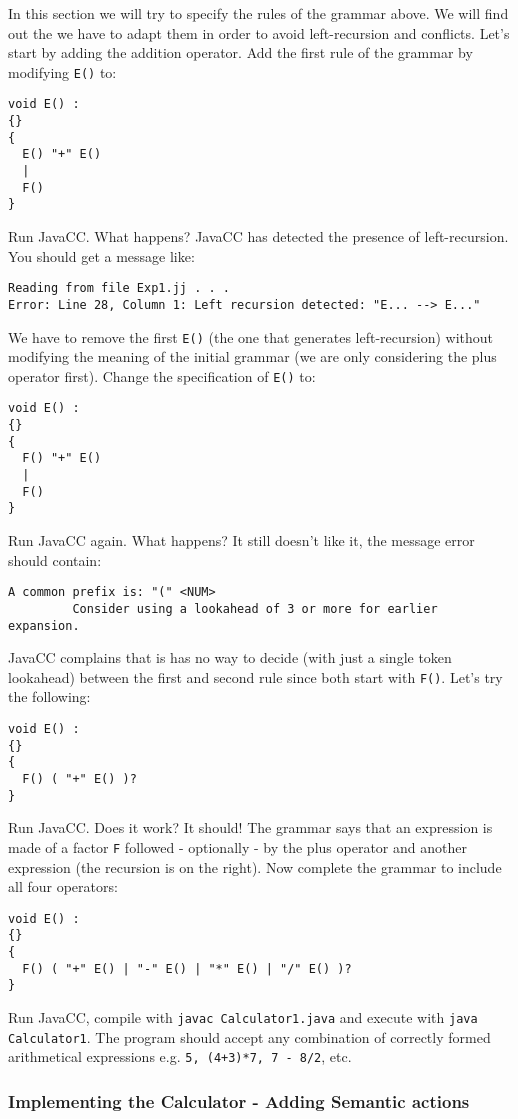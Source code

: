 \documentclass{article}
\begin{document}
In this section we will try to specify the rules of the grammar above. We will find out the we have to adapt them in  order to avoid left-recursion and conflicts. Let's start by adding the addition operator. Add the first rule of the grammar by modifying {\tt E()} to:
\begin{verbatim}
void E() :
{}
{
  E() "+" E()
  |
  F() 
}
\end{verbatim} 
Run JavaCC. What happens? JavaCC has detected the presence of left-recursion. You should get a message like:
\begin{verbatim}
Reading from file Exp1.jj . . .
Error: Line 28, Column 1: Left recursion detected: "E... --> E..."
\end{verbatim}
We have to remove the first {\tt E()} (the one that generates left-recursion) without modifying the meaning of the initial grammar (we are only considering the plus operator first). Change the specification of {\tt E()} to:
\begin{verbatim}
void E() :
{}
{
  F() "+" E()
  |
  F() 
}
\end{verbatim}
Run JavaCC again. What happens? It still doesn't like it, the message error should contain:
\begin{verbatim}
A common prefix is: "(" <NUM>
         Consider using a lookahead of 3 or more for earlier expansion.
\end{verbatim}
JavaCC complains that is has no way to decide (with just a single token lookahead) between the first and second rule since both start with {\tt F()}. Let's try the following:
\begin{verbatim}
void E() :
{}
{
  F() ( "+" E() )?
}
\end{verbatim}
Run JavaCC. Does it work? It should! The grammar says that an expression is made of a factor {\tt F} followed - optionally - by the plus operator and another expression (the recursion is on the right). Now complete the grammar to include all four operators:
\begin{verbatim}
void E() :
{}
{
  F() ( "+" E() | "-" E() | "*" E() | "/" E() )?
}
\end{verbatim}
Run JavaCC, compile with {\tt javac Calculator1.java} and execute with {\tt java Calculator1}. The program should accept any combination of correctly formed arithmetical expressions e.g. {\tt 5, (4+3)*7, 7 - 8/2}, etc.



\subsubsection*{Implementing the Calculator - Adding Semantic actions}
\end{document}

